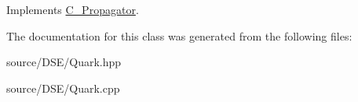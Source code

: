 Implements \hyperlink{class_c___propagator_a2efb521f2afd9ad94c07f62db1d03b8b}{C\-\_\-\-Propagator}.



The documentation for this class was generated from the following files\-:\begin{DoxyCompactItemize}
\item 
source/\-D\-S\-E/Quark.\-hpp\item 
source/\-D\-S\-E/Quark.\-cpp\end{DoxyCompactItemize}
